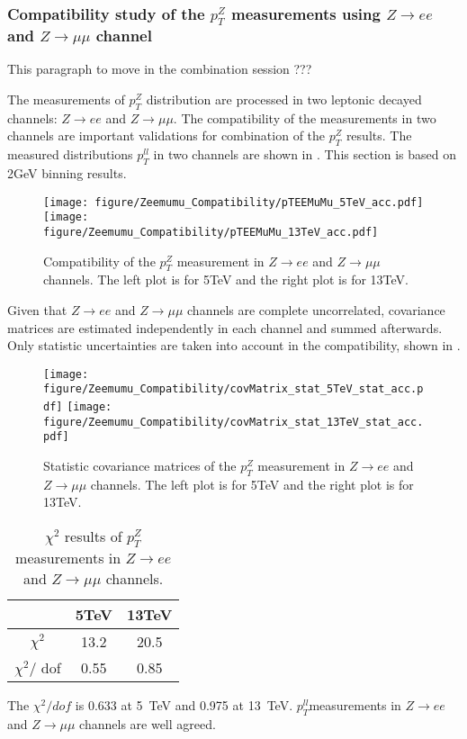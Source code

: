 \subsubsection{Compatibility study of the $p_{T}^{Z}$ measurements using $Z\rightarrow ee$ and $Z\rightarrow \mu\mu$ channel}
\label{sssec:compatibilityEEMuMu}
	
	{\color{blue}  This paragraph to move in the combination session ??? }
	
The measurements of $p_{T}^{Z}$ distribution are processed in two leptonic decayed channels:  $Z\rightarrow ee$ and $Z\rightarrow \mu\mu$.
The compatibility of the measurements in two channels are important validations for combination of the $p_{T}^{Z}$ results.
The measured distributions $p_{T}^{ll}$ in two channels are shown in \Fig{\ref{f:pTeeMuMu}}.
This section is based on 2GeV binning results.

\begin{figure}[h]
  \centering
  \texttt{[image: figure/Zeemumu\_Compatibility/pTEEMuMu\_5TeV\_acc.pdf]}
  \texttt{[image: figure/Zeemumu\_Compatibility/pTEEMuMu\_13TeV\_acc.pdf]}
  \caption{
  Compatibility of the $p_{T}^{Z}$ measurement in $Z\rightarrow ee$ and $Z \rightarrow \mu\mu$ channels. The left plot is for 5TeV and the right plot is for 13TeV.}
    \label{f:pTeeMuMu}
\end{figure}

Given that $Z\rightarrow ee$ and $Z\rightarrow \mu\mu$ channels are complete uncorrelated, covariance matrices are estimated independently in each channel and summed afterwards. 
Only statistic uncertainties are taken into account in the compatibility, shown in \Fig{\ref{f:CovMatricesEEMuMu}}.

\begin{figure}[h]
  \centering
  \texttt{[image: figure/Zeemumu\_Compatibility/covMatrix\_stat\_5TeV\_stat\_acc.pdf]}
  \texttt{[image: figure/Zeemumu\_Compatibility/covMatrix\_stat\_13TeV\_stat\_acc.pdf]}
  \caption{Statistic covariance matrices of the $p_{T}^{Z}$ measurement in $Z\rightarrow ee$ and $Z\rightarrow \mu\mu$ channels. The left plot is for 5TeV and the right plot is for 13TeV.}
    \label{f:CovMatricesEEMuMu}
\end{figure}


\begin{table}[h] 
 \centering
\begin{tabular}{|c|c|c|}
\hline
  & 5TeV & 13TeV\\
 \hline
 $\chi^2$ & 13.2 & 20.5 \\
 \hline
$\chi^2/$ dof & 0.55 & 0.85\\
\hline
\end{tabular}
\caption{$\chi^2$ results of $p_{T}^{Z}$ measurements in $Z\rightarrow ee$ and $Z\rightarrow \mu\mu$ channels.}
\label{tab:chi2highmu}
\end{table}

The $\chi^2/dof$ is 0.633 at 5~TeV and 0.975 at 13~TeV. $p_{T}^{ll}$measurements in $Z\rightarrow ee$ and $Z\rightarrow \mu\mu$ channels are well agreed.